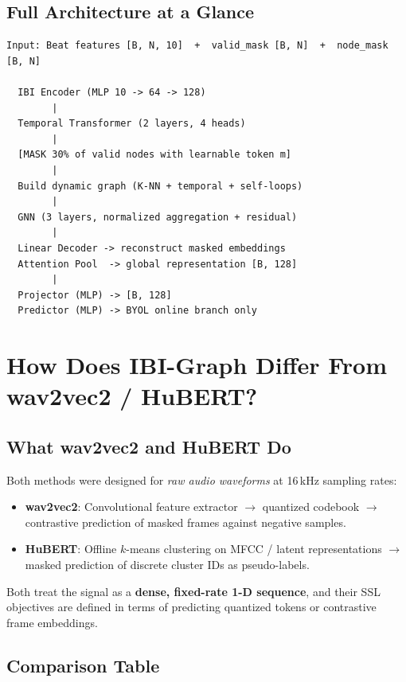 \documentclass[11pt,a4paper]{article}
\begin{document}
\subsection{Full Architecture at a Glance}

\begin{lstlisting}
Input: Beat features [B, N, 10]  +  valid_mask [B, N]  +  node_mask [B, N]

  IBI Encoder (MLP 10 -> 64 -> 128)
        |
  Temporal Transformer (2 layers, 4 heads)
        |
  [MASK 30% of valid nodes with learnable token m]
        |
  Build dynamic graph (K-NN + temporal + self-loops)
        |
  GNN (3 layers, normalized aggregation + residual)
        |
  Linear Decoder -> reconstruct masked embeddings
  Attention Pool  -> global representation [B, 128]
        |
  Projector (MLP) -> [B, 128]
  Predictor (MLP) -> BYOL online branch only
\end{lstlisting}

\section{How Does IBI-Graph Differ From wav2vec2 / HuBERT?}

\subsection{What wav2vec2 and HuBERT Do}

Both methods were designed for \emph{raw audio waveforms} at 16\,kHz sampling rates:
\begin{itemize}[leftmargin=*]
    \item \textbf{wav2vec2}: Convolutional feature extractor $\to$ quantized codebook $\to$ contrastive prediction of masked frames against negative samples.
    \item \textbf{HuBERT}: Offline $k$-means clustering on MFCC / latent representations $\to$ masked prediction of discrete cluster IDs as pseudo-labels.
\end{itemize}
Both treat the signal as a \textbf{dense, fixed-rate 1-D sequence}, and their SSL objectives are
defined in terms of predicting quantized tokens or contrastive frame embeddings.

\subsection{Comparison Table}
\end{document}
